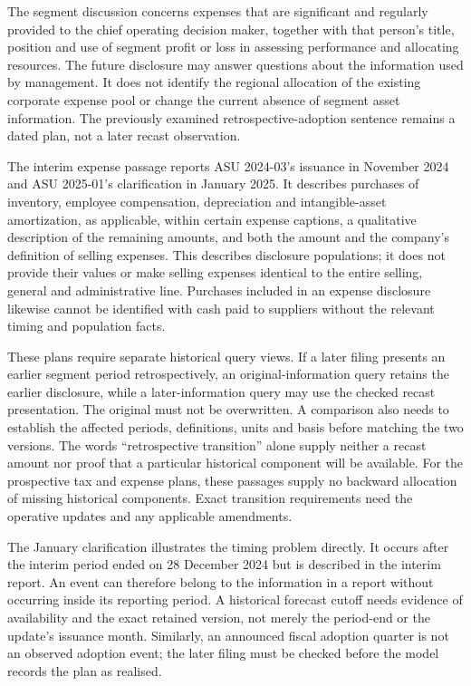 The segment discussion concerns expenses that are significant and regularly
provided to the chief operating decision maker, together with that person's
title, position and use of segment profit or loss in assessing performance and
allocating resources. The future disclosure may answer questions about the
information used by management. It does not identify the regional allocation
of the existing corporate expense pool or change the current absence of
segment asset information. The previously examined retrospective-adoption
sentence remains a dated plan, not a later recast observation.

The interim expense passage reports ASU 2024-03's issuance in November 2024
and ASU 2025-01's clarification in January 2025. It describes purchases of
inventory, employee compensation, depreciation and intangible-asset amortization,
as applicable, within certain expense captions, a qualitative description of
the remaining amounts, and both the amount and the company's definition of
selling expenses. This describes disclosure populations; it does not provide
their values or make selling expenses identical to the entire selling, general
and administrative line. Purchases included in an expense disclosure likewise
cannot be identified with cash paid to suppliers without the relevant timing
and population facts.

These plans require separate historical query views. If a later filing presents
an earlier segment period retrospectively, an original-information query retains
the earlier disclosure, while a later-information query may use the checked
recast presentation. The original must not be overwritten. A comparison also
needs to establish the affected periods, definitions, units and basis before
matching the two versions. The words ``retrospective transition'' alone supply
neither a recast amount nor proof that a particular historical component will
be available. For the prospective tax and expense plans, these passages supply
no backward allocation of missing historical components. Exact transition
requirements need the operative updates and any applicable amendments.

The January clarification illustrates the timing problem directly. It occurs
after the interim period ended on 28 December 2024 but is described in the
interim report. An event can therefore belong to the information in a report
without occurring inside its reporting period. A historical forecast cutoff
needs evidence of availability and the exact retained version, not merely the
period-end or the update's issuance month. Similarly, an announced fiscal
adoption quarter is not an observed adoption event; the later filing must be
checked before the model records the plan as realised.

